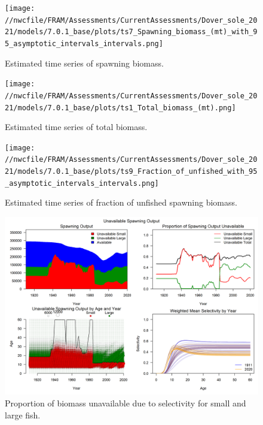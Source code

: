 \documentclass[11pt,
  english,
  a4paper,
]{article}
\begin{document}
\tagmcend\tagstructend


\begin{figure}
\centering
\texttt{[image: //nwcfile/FRAM/Assessments/CurrentAssessments/Dover\_sole\_2021/models/7.0.1\_base/plots/ts7\_Spawning\_biomass\_(mt)\_with\_95\_asymptotic\_intervals\_intervals.png]}
\caption{Estimated time series of spawning biomass.\label{fig:ssb}}
\end{figure}

\tagmcend\tagstructend


\begin{figure}
\centering
\texttt{[image: //nwcfile/FRAM/Assessments/CurrentAssessments/Dover\_sole\_2021/models/7.0.1\_base/plots/ts1\_Total\_biomass\_(mt).png]}
\caption{Estimated time series of total biomass.\label{fig:tot-bio}}
\end{figure}

\tagmcend\tagstructend


\begin{figure}
\centering
\texttt{[image: //nwcfile/FRAM/Assessments/CurrentAssessments/Dover\_sole\_2021/models/7.0.1\_base/plots/ts9\_Fraction\_of\_unfished\_with\_95\_asymptotic\_intervals\_intervals.png]}
\caption{Estimated time series of fraction of unfished spawning biomass.\label{fig:depl}}
\end{figure}

\tagmcend\tagstructend


\begin{figure}
\centering
\includegraphics[width=1\textwidth,height=1\textheight]{figs/unavailable_biomass.png}
\caption{Proportion of biomass unavailable due to selectivity for small and large fish.\label{fig:unavail-bio}}
\end{figure}
\end{document}
